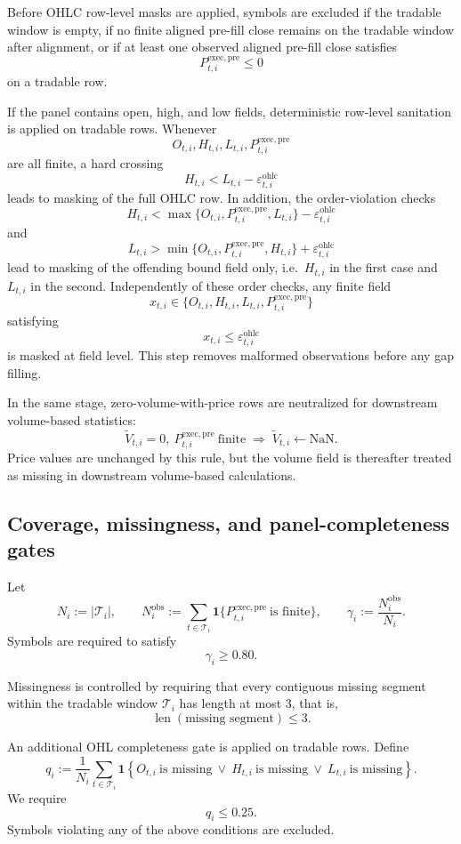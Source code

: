 \documentclass[11pt,a4paper]{article}
\begin{document}
Before OHLC row-level masks are applied, symbols are excluded if the tradable
window is empty, if no finite aligned pre-fill close remains on the tradable
window after alignment, or if at least one observed aligned pre-fill close
satisfies
\[
P^{\mathrm{exec,pre}}_{t,i}\le 0
\]
on a tradable row.

If the panel contains open, high, and low fields, deterministic row-level
sanitation is applied on tradable rows. Whenever
\[
O_{t,i}, H_{t,i}, L_{t,i}, P^{\mathrm{exec,pre}}_{t,i}
\]
are all finite, a hard crossing
\[
H_{t,i}<L_{t,i}-\varepsilon_{t,i}^{\mathrm{ohlc}}
\]
leads to masking of the full OHLC row. In addition, the order-violation checks
\[
H_{t,i}<\max\{O_{t,i},P^{\mathrm{exec,pre}}_{t,i},L_{t,i}\}
-\varepsilon_{t,i}^{\mathrm{ohlc}}
\]
and
\[
L_{t,i}>\min\{O_{t,i},P^{\mathrm{exec,pre}}_{t,i},H_{t,i}\}
+\varepsilon_{t,i}^{\mathrm{ohlc}}
\]
lead to masking of the offending bound field only, i.e.\ \(H_{t,i}\) in the
first case and \(L_{t,i}\) in the second. Independently of these order checks,
any finite field
\[
x_{t,i}\in\{O_{t,i},H_{t,i},L_{t,i},P^{\mathrm{exec,pre}}_{t,i}\}
\]
satisfying
\[
x_{t,i}\le \varepsilon_{t,i}^{\mathrm{ohlc}}
\]
is masked at field level. This step removes malformed observations before any
gap filling.

In the same stage, zero-volume-with-price rows are neutralized for downstream
volume-based statistics:
\[
\widetilde V_{t,i}=0,\ P^{\mathrm{exec,pre}}_{t,i}\ \text{finite}
\;\Longrightarrow\;
\widetilde V_{t,i}\leftarrow \mathrm{NaN}.
\]
Price values are unchanged by this rule, but the volume field is thereafter
treated as missing in downstream volume-based calculations.

\subsection{Coverage, missingness, and panel-completeness gates}

Let
\[
N_i:=|\mathcal T_i|,
\qquad
N_i^{\mathrm{obs}}
:=
\sum_{t\in\mathcal T_i}
\mathbf 1\{P^{\mathrm{exec,pre}}_{t,i}\ \text{is finite}\},
\qquad
\gamma_i:=\frac{N_i^{\mathrm{obs}}}{N_i}.
\]
Symbols are required to satisfy
\[
\gamma_i\ge 0.80.
\]

Missingness is controlled by requiring that every contiguous missing segment
within the tradable window \(\mathcal T_i\) has length at most \(3\), that is,
\[
\operatorname{len}(\text{missing segment})\le 3.
\]

An additional OHL completeness gate is applied on tradable rows. Define
\[
q_i
:=
\frac{1}{N_i}
\sum_{t\in\mathcal T_i}
\mathbf 1\left\{
O_{t,i}\ \text{is missing}\ \vee\
H_{t,i}\ \text{is missing}\ \vee\
L_{t,i}\ \text{is missing}
\right\}.
\]
We require
\[
q_i\le 0.25.
\]
Symbols violating any of the above conditions are excluded.
\end{document}
